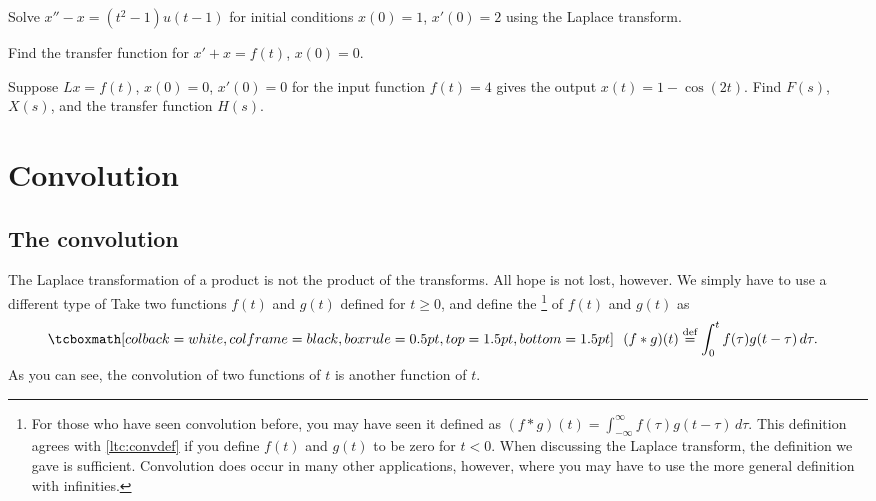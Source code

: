 \begin{exercise}
Solve $x''-x = (t^2-1) u(t-1)$ for initial conditions $x(0)=1$, $x'(0) = 2$
using the Laplace transform.
\end{exercise}
 
\begin{exercise}
Find the transfer function for 
$x' + x = f(t)$,
$x(0)=0$.
\end{exercise}

\begin{exercise}
Suppose $Lx = f(t)$, $x(0)=0$, $x'(0)=0$
for the input function $f(t) = 4$ gives the output
$x(t) = 1 - \cos(2 t)$.  Find $F(s)$, $X(s)$, and the transfer function
$H(s)$.
\end{exercise}


\sectionnewpage
\section{Convolution}
\label{convolution:section}



\subsection{The convolution}

The Laplace transformation of a product is not the product
of the transforms.  All hope is not lost, however.  We simply have to use
a different type of 
Take
two functions $f(t)$ and $g(t)$ defined for $t \geq 0$,
and define the \emph{}%
\footnote{%
For those who have seen convolution before, you may have
seen it defined as
$(f * g)(t) =
\int_{-\infty}^\infty f(\tau) g(t-\tau) \, d\tau$.  This definition
agrees with \eqref{ltc:convdef} if you define $f(t)$ and $g(t)$
to be zero for $t < 0$.
When discussing the Laplace transform, the definition we gave is
sufficient.  Convolution does occur in many other applications, however,
where you may have to use the more general definition with infinities.
}
of $f(t)$ and $g(t)$ as
\begin{equation} \label{ltc:convdef}
\mybxbg{~~
(f * g)(t) \overset{\text{def}}{=}
\int_0^t f(\tau) g(t-\tau) \, d\tau .
~~}
\end{equation}
As you can see, the convolution of two functions of $t$ is another function of $t$.


